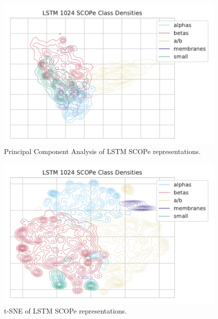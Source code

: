 \documentclass[a4paper,12pt]{article}
\begin{document}
\begin{minipage}{\linewidth}
\begin{minipage}{\linewidth}
	\centering
	\begin{minipage}{0.48\linewidth}
		\begin{figure}[H]
			\includegraphics[width=\linewidth]{figures/fig2c_LSTM_1024_no_trunc_PCA.pdf}
			\caption{Principal Component Analysis of LSTM SCOPe representations.}
			\label{fig:LSTM_pca_compare}
		\end{figure}
	\end{minipage}
	\hfill
	\begin{minipage}{0.48\linewidth}
		\begin{figure}[H]
			\includegraphics[width=\linewidth]{figures/fig2c_LSTM_1024_no_trunc.pdf}
			\caption{t-SNE of LSTM SCOPe representations.}
			\label{fig:LSTM_tSNE_compare}
		\end{figure}

\end{minipage}
\end{minipage}
\end{minipage}
\end{document}
